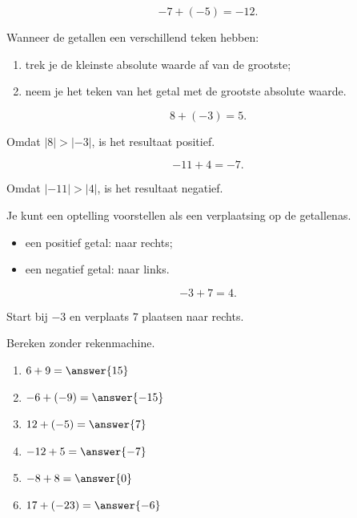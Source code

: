 \documentclass{ximera}
\begin{document}
\begin{example}
\[
-7+(-5)=-12.
\]
\end{example}


Wanneer de getallen een verschillend teken hebben:

\begin{enumerate}
    \item trek je de kleinste absolute waarde af van de grootste;
    \item neem je het teken van het getal met de grootste absolute waarde.
\end{enumerate}

\begin{example}
\[
8+(-3)=5.
\]

Omdat $|8|>|-3|$, is het resultaat positief.
\end{example}

\begin{example}
\[
-11+4=-7.
\]

Omdat $|-11|>|4|$, is het resultaat negatief.
\end{example}


Je kunt een optelling voorstellen als een verplaatsing op de getallenas.

\begin{itemize}
    \item een positief getal: naar rechts;
    \item een negatief getal: naar links.
\end{itemize}

\begin{example}
\[
-3+7=4.
\]

Start bij $-3$ en verplaats $7$ plaatsen naar rechts.
\end{example}

\begin{exercise}
Bereken zonder rekenmachine.

\begin{enumerate}
    \item $6+9=\answer{15}$
    \item $-6+(-9)=\answer{-15}$
    \item $12+(-5)=\answer{7}$
    \item $-12+5=\answer{-7}$
    \item $-8+8=\answer{0}$
    \item $17+(-23)=\answer{-6}$
\end{enumerate}
\end{exercise}
\end{document}
